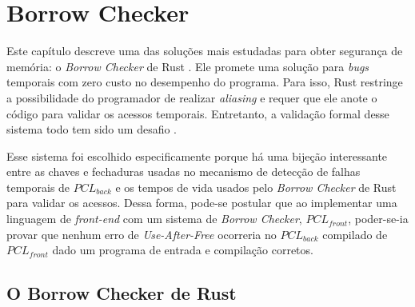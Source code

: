 \chapter{Borrow Checker}
\label{chap4}

Este capítulo descreve uma das soluções mais estudadas para obter segurança de memória:  o \emph{Borrow Checker} de Rust \cite{RUSTBOOK}. Ele promete uma solução para \emph{bugs} temporais com zero custo no desempenho do programa. Para isso, Rust restringe a possibilidade do programador de realizar \emph{aliasing} e requer que ele anote o código para validar os acessos temporais. Entretanto, a validação formal desse sistema todo tem sido um desafio \cite{RUSTBELT,RUSTSYMBOLIC}.


Esse sistema foi escolhido especificamente porque há uma bijeção interessante entre as chaves e fechaduras usadas no mecanismo de detecção de falhas temporais de $PCL_{back}$ e os tempos de vida usados pelo \emph{Borrow Checker} de Rust para validar os acessos. Dessa forma, pode-se postular que ao implementar uma linguagem de \emph{front-end} com um sistema de \emph{Borrow Checker}, $PCL_{front}$, poder-se-ia provar que nenhum erro de \emph{Use-After-Free} ocorreria no $PCL_{back}$ compilado de $PCL_{front}$ dado um programa de entrada e compilação corretos.

\section{O Borrow Checker de Rust}

